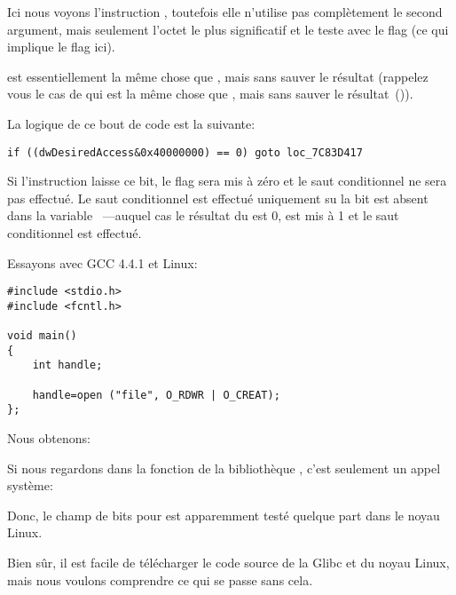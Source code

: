 
Ici nous voyons l'instruction \TEST, toutefois elle n'utilise pas complètement le
second argument, mais seulement l'octet le plus significatif et le teste avec le
flag  (ce qui implique le flag  ici).

\TEST est essentiellement la même chose que \AND, mais sans sauver le résultat
(rappelez vous le cas de \CMP qui est la même chose que \SUB, mais sans sauver le
résultat~()).

La logique de ce bout de code est la suivante:

\begin{lstlisting}[style=customc]
if ((dwDesiredAccess&0x40000000) == 0) goto loc_7C83D417
\end{lstlisting}


Si l'instruction \AND laisse ce bit, le flag \ZF sera mis à zéro et le saut conditionnel
\JZ ne sera pas effectué.
Le saut conditionnel est effectué uniquement su la bit  est absent
dans la variable ~---auquel cas le résultat du \AND est 0, \ZF
est mis à 1 et le saut conditionnel est effectué.

Essayons avec GCC 4.4.1 et Linux:

\begin{lstlisting}[style=customc]
#include <stdio.h>
#include <fcntl.h>

void main()
{
	int handle;

	handle=open ("file", O_RDWR | O_CREAT);
};
\end{lstlisting}

Nous obtenons:




Si nous regardons dans la fonction  de la bibliothèque ,
c'est seulement un appel système:



Donc, le champ de bits pour  est apparemment testé quelque part dans le
noyau Linux.

Bien sûr, il est facile de télécharger le code source de la Glibc et du noyau Linux,
mais nous voulons comprendre ce qui se passe sans cela.

